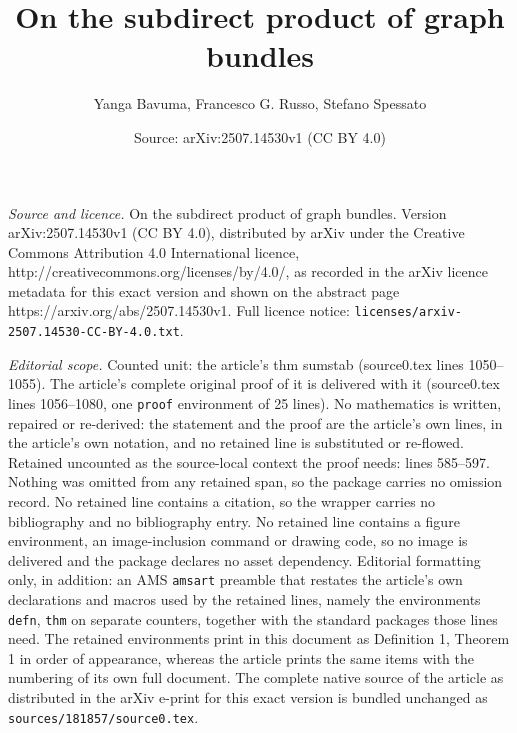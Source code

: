 \documentclass[10pt,a4paper]{amsart}
\title{On the subdirect product of graph bundles}
\author{Yanga Bavuma, Francesco G. Russo, Stefano Spessato}
\date{Source: arXiv:2507.14530v1 (CC BY 4.0)}
\begin{document}
\maketitle

\noindent\emph{Source and licence.} On the subdirect product of graph bundles. Version arXiv:2507.14530v1 (CC BY 4.0), distributed by arXiv under the Creative Commons Attribution 4.0 International licence, http://creativecommons.org/licenses/by/4.0/, as recorded in the arXiv licence metadata for this exact version and shown on the abstract page https://arxiv.org/abs/2507.14530v1. Full licence notice: \texttt{licenses/arxiv-2507.14530-CC-BY-4.0.txt}.\par\smallskip

\noindent\textit{Editorial scope.} Counted unit: the article's thm sumstab (source0.tex lines 1050--1055). The article's complete original proof of it is delivered with it (source0.tex lines 1056--1080, one \texttt{proof} environment of 25 lines). No mathematics is written, repaired or re-derived: the statement and the proof are the article's own lines, in the article's own notation, and no retained line is substituted or re-flowed.  Retained uncounted as the source-local context the proof needs: lines 585--597.  Nothing was omitted from any retained span, so the package carries no omission record.  No retained line contains a citation, so the wrapper carries no bibliography and no bibliography entry.  No retained line contains a figure environment, an image-inclusion command or drawing code, so no image is delivered and the package declares no asset dependency.  Editorial formatting only, in addition: an AMS \texttt{amsart} preamble that restates the article's own declarations and macros used by the retained lines, namely the environments \texttt{defn}, \texttt{thm} on separate counters, together with the standard packages those lines need.  The retained environments print in this document as Definition 1, Theorem 1 in order of appearance, whereas the article prints the same items with the numbering of its own full document.  The complete native source of the article as distributed in the arXiv e-print for this exact version is bundled unchanged as \texttt{sources/181857/source0.tex}.
\end{document}
